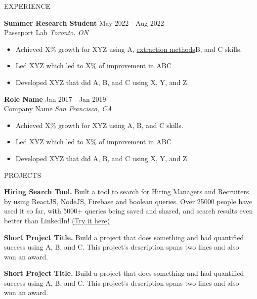 \documentclass{resume} %
\begin{document}
\begin{rSection}{EXPERIENCE}

\textbf{Summer Research Student} \hfill May 2022 - Aug 2022\\
Passeport Lab \hfill \textit{Toronto, ON}
 \begin{itemize}
    \itemsep -3pt {} 
     \item Achieved X\% growth for XYZ using A, \href{https://drive.google.com/file/d/1tVPh5Zt4zLT8spiLfzJ4vu0XZSuMfOfu/view}{extraction methods}B, and C skills.
     \item Led XYZ which led to X\% of improvement in ABC
    \item Developed XYZ that did A, B, and C using X, Y, and Z. 
 \end{itemize}
 
\textbf{Role Name} \hfill Jan 2017 - Jan 2019\\
Company Name \hfill \textit{San Francisco, CA}
 \begin{itemize}
    \itemsep -3pt {} 
     \item Achieved X\% growth for XYZ using A, B, and C skills.
     \item Led XYZ which led to X\% of improvement in ABC
    \item Developed XYZ that did A, B, and C using X, Y, and Z. 
 \end{itemize}

\end{rSection} 


\begin{rSection}{PROJECTS}
\vspace{-1.25em}
\item \textbf{Hiring Search Tool.} {Built a tool to search for Hiring Managers and Recruiters by using ReactJS, NodeJS, Firebase and boolean queries. Over 25000 people have used it so far, with 5000+ queries being saved and shared, and search results even better than LinkedIn! \href{https://hiring-search.careerflow.ai/}{(Try it here)}}
\item \textbf{Short Project Title.} {Build a project that does something and had quantified success using A, B, and C. This project's description spans two lines and also won an award.}
\item \textbf{Short Project Title.} {Build a project that does something and had quantified success using A, B, and C. This project's description spans two lines and also won an award.}
\end{rSection} 
\end{document}
